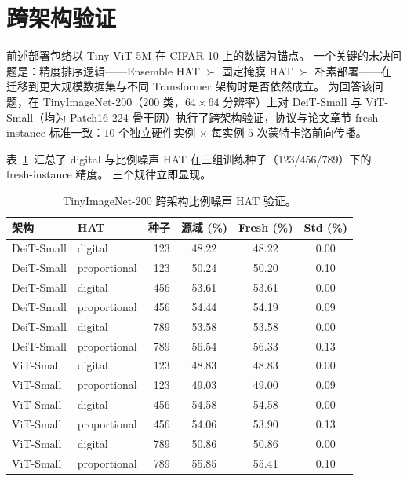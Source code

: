 \section{跨架构验证}
\label{sec:cross-architecture-validation}

前述部署包络以 Tiny-ViT-5M 在 CIFAR-10 上的数据为锚点。
一个关键的未决问题是：精度排序逻辑——Ensemble HAT $\succ$ 固定掩膜 HAT $\succ$ 朴素部署——在迁移到更大规模数据集与不同 Transformer 架构时是否依然成立。
为回答该问题，在 TinyImageNet-200（$200$ 类，$64\times64$ 分辨率）上对 DeiT-Small 与 ViT-Small（均为 Patch16-224 骨干网）执行了跨架构验证，协议与论文章节 fresh-instance 标准一致：$10$ 个独立硬件实例 $\times$ 每实例 $5$ 次蒙特卡洛前向传播。

表~\ref{tab:cross-arch-proportional}~汇总了 digital 与比例噪声 HAT 在三组训练种子（123/456/789）下的 fresh-instance 精度。
三个规律立即显现。

\begin{table}[t]
\centering
\caption{TinyImageNet-200 跨架构比例噪声 HAT 验证。}
\label{tab:cross-arch-proportional}
\footnotesize
\begin{tabularx}{\textwidth}{@{}>{\raggedright\arraybackslash}X>{\raggedright\arraybackslash}Xrccc@{}}
\toprule
\textbf{架构} & \textbf{HAT} & \textbf{种子} & \textbf{源域 (\%)} & \textbf{Fresh (\%)} & \textbf{Std (\%)} \\
\midrule
DeiT-Small & digital & 123 & 48.22 & 48.22 & 0.00 \\
DeiT-Small & proportional & 123 & 50.24 & 50.20 & 0.10 \\
DeiT-Small & digital & 456 & 53.61 & 53.61 & 0.00 \\
DeiT-Small & proportional & 456 & 54.44 & 54.19 & 0.09 \\
DeiT-Small & digital & 789 & 53.58 & 53.58 & 0.00 \\
DeiT-Small & proportional & 789 & 56.54 & 56.33 & 0.13 \\
\midrule
ViT-Small & digital & 123 & 48.83 & 48.83 & 0.00 \\
ViT-Small & proportional & 123 & 49.03 & 49.00 & 0.09 \\
ViT-Small & digital & 456 & 54.58 & 54.58 & 0.00 \\
ViT-Small & proportional & 456 & 54.06 & 53.90 & 0.13 \\
ViT-Small & digital & 789 & 50.86 & 50.86 & 0.00 \\
ViT-Small & proportional & 789 & 55.85 & 55.41 & 0.10 \\
\bottomrule
\end{tabularx}
\end{table}

